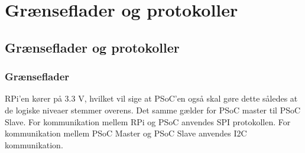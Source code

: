 \chapter{Grænseflader og protokoller}
\section{Grænseflader og protokoller}
\subsection{Grænseflader}
RPi'en kører på 3.3 V, hvilket vil sige at PSoC'en også skal gøre dette således at de logiske niveaer stemmer overens. Det samme gælder for PSoC master til PSoC Slave. For kommunikation mellem RPi og PSoC anvendes SPI protokollen. For kommunikation mellem PSoC Master og PSoC Slave anvendes I2C kommunikation.
